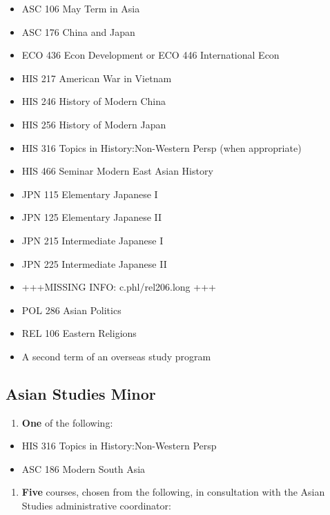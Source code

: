 \documentclass[
  letterpaper,
]{scrbook}
\providecommand{\tightlist}{%
  \setlength{\itemsep}{0pt}\setlength{\parskip}{0pt}}
\begin{document}
\begin{itemize}
\tightlist
\item
  ASC 106 May Term in Asia
\item
  ASC 176 China and Japan
\item
  ECO 436 Econ Development or ECO 446 International Econ
\item
  HIS 217 American War in Vietnam
\item
  HIS 246 History of Modern China
\item
  HIS 256 History of Modern Japan
\item
  HIS 316 Topics in History:Non-Western Persp (when appropriate)
\item
  HIS 466 Seminar Modern East Asian History
\item
  JPN 115 Elementary Japanese I
\item
  JPN 125 Elementary Japanese II
\item
  JPN 215 Intermediate Japanese I
\item
  JPN 225 Intermediate Japanese II
\item
  +++MISSING INFO: c.phl/rel206.long +++
\item
  POL 286 Asian Politics
\item
  REL 106 Eastern Religions
\item
  A second term of an overseas study program
\end{itemize}

\subsection{Asian Studies Minor}\label{asian-studies-minor}

\begin{enumerate}
\def\labelenumi{\arabic{enumi}.}
\tightlist
\item
  \textbf{One} of the following:
\end{enumerate}

\begin{itemize}
\tightlist
\item
  HIS 316 Topics in History:Non-Western Persp
\item
  ASC 186 Modern South Asia
\end{itemize}

\begin{enumerate}
\def\labelenumi{\arabic{enumi}.}
\setcounter{enumi}{1}
\tightlist
\item
  \textbf{Five} courses, chosen from the following, in consultation with
  the Asian Studies administrative coordinator:
\end{enumerate}
\end{document}
